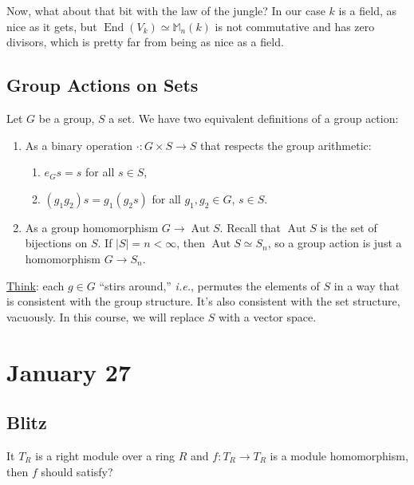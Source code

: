 \documentclass[12pt]{article}
\newcommand{\ita}[1]{\textit{#1}}
\theoremstyle{definition}
\DeclareMathOperator\Aut{Aut}
\DeclareMathOperator\End{End}
\newcommand{\m}{\mathbb{M}}
\begin{document}
Now, what about that bit with the law of the jungle? In our case $k$ is a field, as nice as it gets, but $\End(V_k) \simeq \m_n(k)$ is not commutative and has zero divisors, which is pretty far from being as nice as a field.
\subsection{Group Actions on Sets}
Let $G$ be a group, $S$ a set. We have two equivalent definitions of a group action:
\begin{enumerate}
    \item As a binary operation $\cdot:G\times S\to S$ that respects the group arithmetic:
    \begin{enumerate}
        \item $e_Gs=s$ for all $s\in S$,
        \item $(g_1g_2)s=g_1(g_2s)$ for all $g_1,g_2\in G$, $s\in S$.
    \end{enumerate}
    \item As a group homomorphism $G\to\Aut S$. Recall that $\Aut S$ is the set of bijections on $S$. If $|S|=n<\infty$, then $\Aut S\simeq S_n$, so a group action is just a homomorphism $G\to S_n$.
\end{enumerate}
\underline{Think}: each $g\in G$ ``stirs around,'' \ita{i.e.}, permutes the elements of $S$ in a way that is consistent with the group structure. It's also consistent with the set structure, vacuously. In this course, we will replace $S$ with a vector space.
\section{January 27}
\subsection{Blitz}
It $T_R$ is a right module over a ring $R$ and $f:T_R\to T_R$ is a module homomorphism, then $f$ should satisfy?
\end{document}
